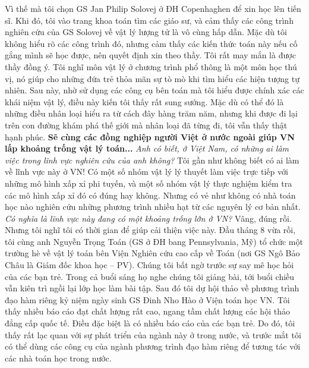 \begin{multicols}{2}
	\vskip 0.1cm
	Vì thế mà tôi chọn GS Jan Philip Solovej ở ĐH Copenhaghen để xin học lên tiến sĩ. Khi đó, tôi vào trang khoa toán tìm các giáo sư, và cảm thấy các công trình nghiên cứu của GS Solovej về vật lý lượng tử là vô cùng hấp dẫn. Mặc dù tôi không hiểu rõ các công trình đó, nhưng cảm thấy các kiến thức toán này nếu cố gắng mình sẽ học được, nên quyết định xin theo thầy. Tôi rất may mắn là được thầy đồng ý. 
	\vskip 0.1cm
	Tôi nghĩ môn vật lý ở chương trình phổ thông là một môn học thú vị, nó giúp cho những đứa trẻ thỏa mãn sự tò mò khi tìm hiểu các hiện tượng tự nhiên. Sau này, nhờ sử dụng các công cụ bên toán mà tôi hiểu được chính xác các khái niệm vật lý, điều này kiến tôi thấy rất sung sướng. Mặc dù có thể đó là những điều nhân loại hiểu ra từ cách đây hàng trăm năm, nhưng khi được đi lại trên con đường khám phá thế giới mà nhân loại đã từng đi, tôi vẫn thấy thật hạnh phúc. 
	\vskip 0.1cm
	\textbf{\color{diendantoanhoc}Sẽ cùng các đồng nghiệp người Việt ở nước ngoài giúp VN lấp khoảng trống vật lý toán...}
	\vskip 0.1cm
	\textit{Anh có biết, ở Việt Nam, có những ai làm việc trong lĩnh vực nghiên cứu của anh không?}
	\vskip 0.1cm 
	Tôi gần như không biết có ai làm về lĩnh vực này ở VN! Có một số nhóm vật lý lý thuyết làm việc trực tiếp với những mô hình xấp xỉ phi tuyến, và một số nhóm vật lý thực nghiệm kiểm tra các mô hình xấp xỉ đó có đúng hay không. Nhưng có vẻ như không có nhà toán học nào nghiên cứu những phương trình nhiều hạt từ các nguyên lý cơ \linebreak bản nhất.  
	\vskip 0.1cm
	\textit{Có nghĩa là lĩnh vực này đang có một khoảng trống lớn ở VN?}
	\vskip 0.1cm 
	Vâng, đúng rồi. Nhưng tôi nghĩ tôi có thời gian để giúp cải thiện việc này. 
	\vskip 0.1cm
	Đầu tháng $8$ vừa rồi, tôi cùng anh Nguyễn Trọng Toán (GS ở ĐH bang Pennsylvania, Mỹ) tổ chức một trường hè về vật lý toán bên Viện Nghiên cứu cao cấp về Toán (nơi GS Ngô Bảo Châu là Giám đốc khoa học -- PV). Chúng tôi bất ngờ trước sự say mê học hỏi của các bạn trẻ. Trong cả buổi sáng họ nghe chúng tôi giảng bài, tới buổi chiều vẫn kiên trì ngồi lại lớp học làm bài tập. Sau đó tôi dự hội thảo về phương trình đạo hàm riêng kỷ niệm ngày sinh GS Đinh Nho Hào ở Viện toán học VN. Tôi thấy nhiều báo cáo đạt chất lượng rất cao, ngang tầm chất lượng các hội thảo đẳng cấp quốc tế. Điều đặc biệt là có nhiều báo cáo của các bạn trẻ. Do đó, tôi thấy rất lạc quan với sự phát triển của ngành này ở trong nước, và trước mắt tôi có thể dùng các công cụ của ngành phương trình đạo hàm riêng để tương tác với các nhà toán học trong nước. 
	\vskip 0.1cm

\end{multicols}
